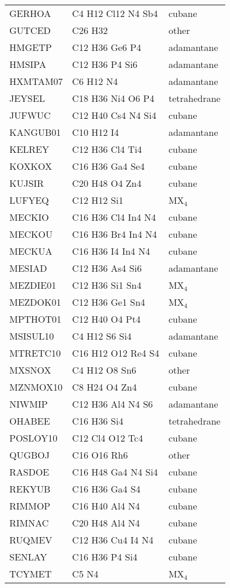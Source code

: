 \documentclass{article}
\begin{document}
\begin{table}
\begin{tabular}{lll}
GERHOA & C4 H12 Cl12 N4 Sb4 & cubane\\
GUTCED & C26 H32 & other\\
HMGETP & C12 H36 Ge6 P4 & adamantane\\
HMSIPA & C12 H36 P4 Si6 & adamantane\\
HXMTAM07 & C6 H12 N4 & adamantane\\
JEYSEL & C18 H36 Ni4 O6 P4 & tetrahedrane\\
JUFWUC & C12 H40 Cs4 N4 Si4 & cubane\\
KANGUB01 & C10 H12 I4 & adamantane\\
KELREY & C12 H36 Cl4 Ti4 & cubane\\
KOXKOX & C16 H36 Ga4 Se4 & cubane\\
KUJSIR & C20 H48 O4 Zn4 & cubane\\
LUFYEQ & C12 H12 Si1 & MX$_4$\\
MECKIO & C16 H36 Cl4 In4 N4 & cubane\\
MECKOU & C16 H36 Br4 In4 N4 & cubane\\
MECKUA & C16 H36 I4 In4 N4 & cubane\\
MESIAD & C12 H36 As4 Si6 & adamantane\\
MEZDIE01 & C12 H36 Si1 Sn4 & MX$_4$\\
MEZDOK01 & C12 H36 Ge1 Sn4 & MX$_4$\\
MPTHOT01 & C12 H40 O4 Pt4 & cubane \\
MSISUL10 & C4 H12 S6 Si4 & adamantane\\
MTRETC10 & C16 H12 O12 Re4 S4 & cubane\\
MXSNOX & C4 H12 O8 Sn6 & other\\
MZNMOX10 & C8 H24 O4 Zn4 & cubane\\
NIWMIP & C12 H36 Al4 N4 S6 & adamantane\\
OHABEE & C16 H36 Si4 & tetrahedrane\\
POSLOY10 & C12 Cl4 O12 Tc4 & cubane\\
QUGBOJ & C16 O16 Rh6 & other\\
RASDOE & C16 H48 Ga4 N4 Si4 & cubane\\
REKYUB & C16 H36 Ga4 S4 & cubane\\
RIMMOP & C16 H40 Al4 N4 & cubane\\
RIMNAC & C20 H48 Al4 N4 & cubane\\
RUQMEV & C12 H36 Cu4 I4 N4 & cubane\\
SENLAY & C16 H36 P4 Si4 & cubane\\
TCYMET & C5 N4 & MX$_4$\\

\end{tabular}
\end{table}
\end{document}

